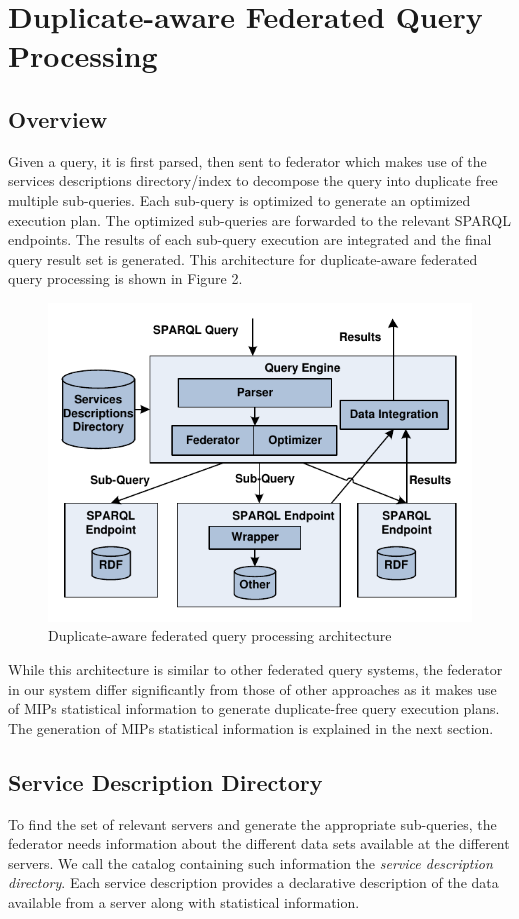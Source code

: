 \documentclass{sig-alternate}  %
\begin{document}
\section{Duplicate-aware Federated Query Processing }
\subsection{Overview}
 Given a query, it is first parsed, then sent to federator which makes use of the services descriptions directory/index
to decompose the query into duplicate free multiple sub-queries. Each sub-query is optimized to generate an optimized execution plan. The optimized sub-queries are forwarded to the relevant SPARQL endpoints. The results of each sub-query execution are integrated and the final query result set is generated. This architecture for duplicate-aware federated query processing is shown in Figure 2.
\begin{figure}
\begin{centering}
\includegraphics[scale=0.7]{img/Fig1} 
\par\end{centering}
\centering{}\caption{Duplicate-aware federated query processing architecture}
\end{figure}
While this architecture is similar to other federated query systems, the federator in our
system differ significantly from those of other approaches as it
makes use of MIPs statistical information to generate duplicate-free
query execution plans. The generation of MIPs statistical information
is explained in the next section.
\subsection{Service Description Directory}
To find the set of relevant servers and generate 
the appropriate sub-queries, the federator needs information about the
different data sets available at the different servers. We call the catalog containing such information 
the \emph{service description directory}. Each service description
provides a declarative description of the data available from a server
along with statistical information. 
\end{document}
